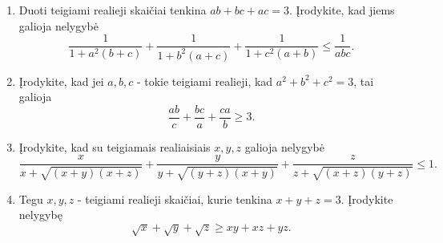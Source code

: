 \begin{enumerate}
  \item {} Duoti teigiami realieji
    skaičiai tenkina $ab+bc+ac=3$. Įrodykite, kad jiems galioja nelygybė
    $$\frac{1}{1+a^2(b+c)}+\frac{1}{1+b^2(a+c)}+\frac{1}{1+c^2(a+b)}\leq\frac{1}{abc}.$$
  \item {} Įrodykite, kad jei $a,b,c$  - tokie
    teigiami realieji, kad $a^2+b^2+c^2=3$, tai galioja
    $$\frac{ab}{c}+\frac{bc}{a}+\frac{ca}{b}\geq3.$$
  \item {} Įrodykite,
    kad su teigiamais realiaisiais $x,y,z$ galioja nelygybė
    $$\frac{x}{x+\sqrt{(x+y)(x+z)}}+\frac{y}{y+\sqrt{(y+z)(x+y)}}+\frac{z}{z+\sqrt{(x+z)(y+z)}}\leq1.$$
  \item \text{[Russia 2002]} Tegu $x,y,z$ - teigiami realieji skaičiai,
    kurie tenkina $x+y+z=3$. Įrodykite nelygybę
    $$\sqrt{x}+\sqrt{y}+\sqrt{z}\geq xy+xz+yz.$$

\end{enumerate}
